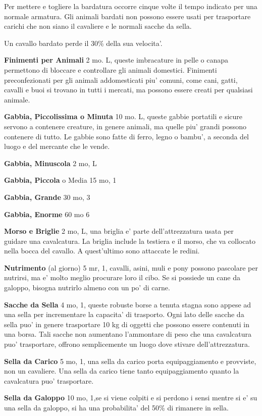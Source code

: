 \documentclass[a4paper,11pt,twoside,openany]{book}
\begin{document}
{Per mettere e togliere la bardatura occorre cinque volte il tempo indicato per una normale armatura. Gli animali bardati non possono essere usati per trasportare carichi che non siano il cavaliere e le normali sacche da sella.

Un cavallo bardato perde il 30\% della sua velocita'.

\textbf{Finimenti per Animali} 2 mo. L, queste imbracature in pelle o canapa permettono di bloccare e controllare gli animali domestici. Finimenti preconfezionati per gli animali addomesticati piu' comuni, come cani, gatti, cavalli e buoi si trovano in tutti i mercati, ma possono essere creati per qualsiasi animale.

\textbf{Gabbia, Piccolissima o Minuta} 10 mo. L, queste gabbie portatili e sicure servono a contenere creature, in genere animali, ma quelle piu' grandi possono contenere di tutto. Le gabbie sono fatte di ferro, legno o bambu', a seconda del luogo e del mercante che le vende. 

\textbf{Gabbia, Minuscola} 2 mo, L

\textbf{Gabbia, Piccola} o Media 15 mo, 1

\textbf{Gabbia, Grande} 30 mo, 3

\textbf{Gabbia, Enorme} 60 mo 6

\textbf{Morso e Briglie} 2 mo, L, una briglia e' parte dell'attrezzatura usata per guidare una cavalcatura. La briglia include la testiera e il morso, che va collocato nella bocca del cavallo. A quest'ultimo sono attaccate le redini.

\textbf{Nutrimento} (al giorno) 5 mr,  1, cavalli, asini, muli e pony possono pascolare per nutrirsi, ma e' molto meglio procurare loro il cibo. Se si possiede un cane da galoppo, bisogna nutrirlo almeno con un po' di carne.

\textbf{Sacche da Sella} 4 mo, 1, queste robuste borse a tenuta stagna sono appese ad una sella per incrementare la capacita' di trasporto.
Ogni lato delle sacche da sella puo' in genere trasportare 10 kg di oggetti che possono essere contenuti in una borsa.
Tali sacche non aumentano l'ammontare di peso che una cavalcatura puo' trasportare, offrono semplicemente un luogo dove stivare dell'attrezzatura.

\textbf{Sella da Carico} 5 mo, 1, una sella da carico porta equipaggiamento e provviste, non un cavaliere. Una sella da carico tiene tanto equipaggiamento quanto la cavalcatura puo' trasportare.

\textbf{Sella da Galoppo} 10 mo, 1,se si viene colpiti e si perdono i sensi mentre si e' su una sella da galoppo, si ha una probabilita' del 50\% di rimanere in sella.

}
\end{document}
